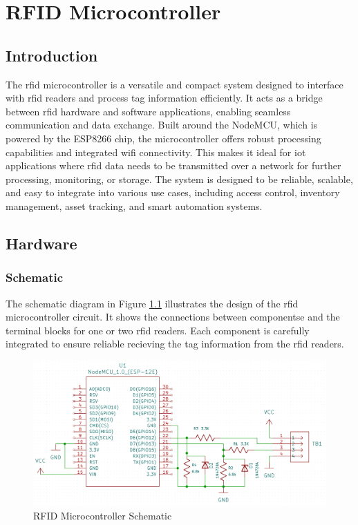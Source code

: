 \chapter{RFID Microcontroller}
\section{Introduction}
The \gls{rfid} microcontroller is a versatile and compact system designed to interface with \gls{rfid} readers and process tag information efficiently. It acts as a bridge between \gls{rfid} 
hardware and software applications, enabling seamless communication and data exchange. Built around the NodeMCU, which is powered by the ESP8266 chip, the microcontroller 
offers robust processing capabilities and integrated \gls{wifi} connectivity. This makes it ideal for \gls{iot} applications where \gls{rfid} data needs to be transmitted over a network for further 
processing, monitoring, or storage. The system is designed to be reliable, scalable, and easy to integrate into various use cases, including access control, inventory management, asset tracking, 
and smart automation systems.
\section{Hardware}
\subsection{Schematic}
The schematic diagram in Figure \ref{fig:rfid-schematic} illustrates the design of the \gls{rfid} microcontroller circuit. It shows the connections between componentse and the terminal blocks for one or two \gls{rfid} readers. 
Each component is carefully integrated to ensure reliable recieving the tag information from the \gls{rfid} readers.

\begin{figure}[H]
  \centering
    \includegraphics[scale=0.2]{../Images/rfid_schematic.png}
  \caption{RFID Microcontroller Schematic}
  \label{fig:rfid-schematic}
\end{figure}

